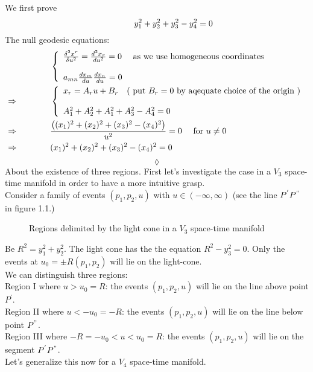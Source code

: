 We first prove 
$$\mathbf{\quad\quad\quad\quad} y^2_1+y^2_2+y^2_3-y^2_4=0$$
The null geodesic equations:
\begin{align}
& \left\{ \begin{array}{l}
\frac{\delta^2 x^r}{\delta u^2} = \dv[2]{x_r}{u} =0 \quad \text{ as we use homogeneous coordinates}\\\\
a_{mn} \dv{x_m}{u}\dv{x_n}{u}=0\\
\end{array} \right.\\
\Rightarrow \quad\quad\quad\quad & \left\{ \begin{array}{l}
x_r = A_ru+B_r\quad \text{( put } B_r=0 \text{ by aqequate choice of the origin )} \\\\
A_1^2+A_2^2+A_1^2+A_3^2-A_4^2=0\\
\end{array} \right.\\
\Rightarrow \quad\quad\quad\quad &\frac{\left((x_1)^2+(x_2)^2+(x_3)^2-(x_4)^2\right)}{u^2} = 0\quad \text{ for } u\neq 0\\
\Rightarrow \quad\quad\quad\quad &(x_1)^2+(x_2)^2+(x_3)^2-(x_4)^2 = 0
\end{align}
$$\lozenge$$
About the existence of three regions. First let's investigate the case in a $V_3$ space-time manifold in order to have a more intuitive grasp.\\
Consider a family of events $(p_1,p_2,u)$ with $u\in\left(-\infty,\infty\right)$ (see the line $P^{'}P^{"}$ in figure 1.1.)
\begin{figure}[H]

\caption{Regions delimited by the light cone in a $V_3$ space-time manifold}
\label{fig:fig_p96_3415_a}
\end{figure}
Be $R^2 = y_1^2 +y_2^2$. The light cone has the the equation $R^2- y_3^2=0$. Only the events at $ u_0 = \pm R(p_1,p_2)$ will lie on the light-cone.\\
We can distinguish three regions:\\
Region I where $u > u_0 = R$: the events $(p_1,p_2,u)$ will lie on the line above point $P^{'}$.\\
Region II where $ u < -u_0 = -R$: the events $(p_1,p_2,u)$ will lie on the line below point $P^{"}$.\\
Region III where $ -R= -u_0 < u < u_0 = R$: the events $(p_1,p_2,u)$ will lie on the segment $P^{'}P^{"}$.\\
Let's generalize this now for a $V_4$ space-time manifold.\\
